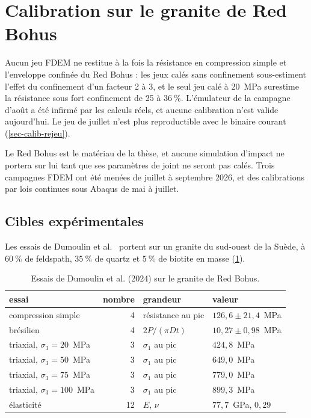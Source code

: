 \section{Calibration sur le granite de Red Bohus}
\label{sec-calib}

Aucun jeu FDEM ne restitue à la fois la résistance en compression simple et l'enveloppe confinée du Red Bohus : les jeux calés sans confinement sous-estiment l'effet du confinement d'un facteur 2 à 3, et le seul jeu calé à 20~MPa surestime la résistance sous fort confinement de 25 à $36~\%$. L'émulateur de la campagne d'août a été infirmé par les calculs réels, et aucune calibration n'est valide aujourd'hui. Le jeu de juillet n'est plus reproductible avec le binaire courant (\cref{sec-calib-rejeu}).

Le Red Bohus est le matériau de la thèse, et aucune simulation d'impact ne portera sur lui tant que ses paramètres de joint ne seront pas calés. Trois campagnes FDEM ont été menées de juillet à septembre 2026, et des calibrations par lois continues sous Abaqus de mai à juillet.

\subsection{Cibles expérimentales}

Les essais de Dumoulin et al.~\cite{dumoulin2024data} portent sur un granite du sud-ouest de la Suède, à $60~\%$ de feldspath, $35~\%$ de quartz et $5~\%$ de biotite en masse (\cref{tab-cibles}).

\begin{table}[htbp]
\centering
\caption{Essais de Dumoulin et al. (2024) sur le granite de Red Bohus.}
\label{tab-cibles}
\small
\begin{tabular}{@{}lrll@{}}
\toprule
essai & nombre & grandeur & valeur \\
\midrule
compression simple & 4 & résistance au pic & $126{,}6 \pm 21{,}4$~MPa \\
brésilien & 4 & $2P/(\pi D t)$ & $10{,}27 \pm 0{,}98$~MPa \\
triaxial, $\sigma_3 = 20$~MPa & 3 & $\sigma_1$ au pic & $424{,}8$~MPa \\
triaxial, $\sigma_3 = 50$~MPa & 3 & $\sigma_1$ au pic & $649{,}0$~MPa \\
triaxial, $\sigma_3 = 75$~MPa & 3 & $\sigma_1$ au pic & $779{,}0$~MPa \\
triaxial, $\sigma_3 = 100$~MPa & 3 & $\sigma_1$ au pic & $899{,}3$~MPa \\
élasticité & 12 & $E$, $\nu$ & $77{,}7$~GPa, $0{,}29$ \\
\bottomrule
\end{tabular}
\end{table}

